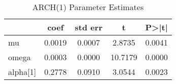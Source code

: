\begin{table}
\caption{ARCH(1) Parameter Estimates}
\label{tab:arch_1}
\begin{tabular}{lcccc}
\toprule
 & coef & std err & t & P>|t| \\
\midrule
mu & 0.0019 & 0.0007 & 2.8735 & 0.0041 \\
omega & 0.0003 & 0.0000 & 10.7179 & 0.0000 \\
alpha[1] & 0.2778 & 0.0910 & 3.0544 & 0.0023 \\
\bottomrule
\end{tabular}
\end{table}
